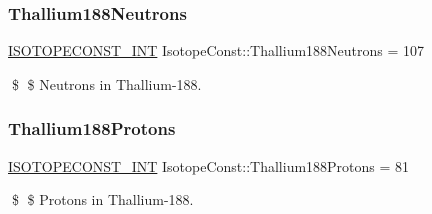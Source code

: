 \subsubsection{\texorpdfstring{Thallium188\+Neutrons}{Thallium188Neutrons}}
{\footnotesize\ttfamily \mbox{\hyperlink{group___isotope_const-_macros_ga5f18360b3e99483a35c32d789e62621c}{I\+S\+O\+T\+O\+P\+E\+C\+O\+N\+S\+T\+\_\+\+I\+NT}} Isotope\+Const\+::\+Thallium188\+Neutrons = 107}

\$ \$ Neutrons in Thallium-\/188. \mbox{\label{group___isotope_const-_thallium-_tl188_ga60fb7ce286fc7b7bc282145a81059416}} 
\subsubsection{\texorpdfstring{Thallium188\+Protons}{Thallium188Protons}}
{\footnotesize\ttfamily \mbox{\hyperlink{group___isotope_const-_macros_ga5f18360b3e99483a35c32d789e62621c}{I\+S\+O\+T\+O\+P\+E\+C\+O\+N\+S\+T\+\_\+\+I\+NT}} Isotope\+Const\+::\+Thallium188\+Protons = 81}

\$ \$ Protons in Thallium-\/188. 